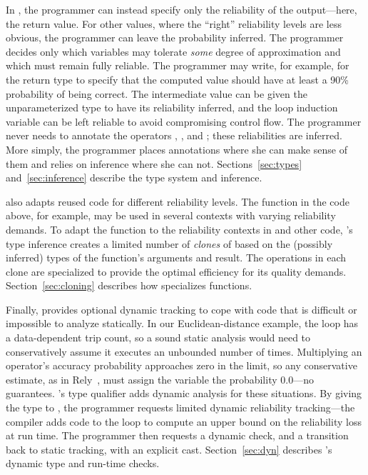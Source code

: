 {In \lang, the programmer can instead specify only the reliability of the
output---here, the return value.
For other values, where the ``right'' reliability levels are less obvious, the
programmer can leave the probability inferred.
The programmer decides only which variables may tolerate \emph{some} degree of
approximation and which must remain fully reliable.
The programmer may write, for example,  for the
return type to specify that the computed value should have at least a 90\%
probability of being correct.
The intermediate value  can be given the
unparameterized type  to have its reliability inferred, and
the loop induction variable  can be left reliable to avoid compromising
control flow.
The programmer never needs to annotate the
operators \code{-}, \code{*}, and \code{+}; these reliabilities are inferred.
More simply, the programmer places annotations where she can make sense of
them and relies on inference where she can not.
Sections~\ref{sec:types} and~\ref{sec:inference} describe the type system and
inference.

\lang also adapts reused code for different reliability levels.
The  function in the code above, for example, may be used in
several contexts with varying reliability demands.
To adapt the  function to the reliability contexts in 
and other code,
\lang's type inference creates a limited number of \emph{clones} of
 based on the (possibly inferred) types of the function's arguments
and result.
The operations in each clone are specialized to provide the optimal efficiency
for its quality demands.
Section~\ref{sec:cloning} describes how \lang specializes
functions.

Finally, \lang provides optional dynamic tracking to cope with code that
is difficult or impossible to analyze statically.
In our Euclidean-distance example, the  loop has a data-dependent
trip count, so a sound static analysis would need to conservatively assume it
executes an unbounded number of times.
Multiplying an operator's accuracy probability approaches zero in the limit,
so any conservative estimate, as in Rely~\cite{rely},
must assign the  variable
the probability 0.0---no guarantees.
\lang's  type qualifier adds dynamic analysis for
these situations.
By giving the type  to , the programmer
requests limited dynamic reliability tracking---the
compiler adds code to the loop to compute an upper bound on the reliability
loss at run time.
The programmer then requests a dynamic check, and a transition back to static
tracking, with an explicit  cast.
Section~\ref{sec:dyn} describes \lang's dynamic type and run-time checks.

}
